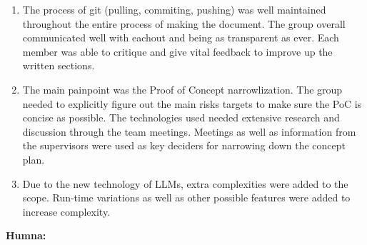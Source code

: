 \documentclass{article}
\begin{document}
\begin{enumerate}
	\item The process of git (pulling, commiting, pushing) was well maintained throughout the entire process of making the document.
	The group overall communicated well with eachout and being as transparent as ever. Each member was able to critique and give vital
	feedback to improve up the written sections.
	\item The main painpoint was the Proof of Concept narrowlization. The group needed to explicitly figure out the main risks targets
	to make sure the PoC is concise as possible. The technologies used needed extensive research and discussion through the team meetings.
	Meetings as well as information from the supervisors were used as key deciders for narrowing down the concept plan.
	\item Due to the new technology of LLMs, extra complexities were added to the scope. Run-time variations as well as other possible
	features were added to increase complexity.  
\end{enumerate}


\noindent \textbf{Humna:}
\end{document}
